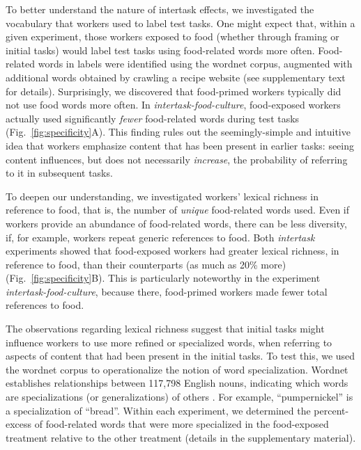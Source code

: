 \documentclass{pnastwo}
\begin{document}
\begin{article}
To better understand the nature of intertask effects, we investigated the
vocabulary that workers used to label test tasks. One might expect that, within
a given experiment, those workers exposed to food (whether through framing or
initial tasks) would label test tasks using food-related words more often.
Food-related words in labels were identified using the wordnet corpus,
augmented with additional words obtained by crawling a recipe website (see
supplementary text for details).  Surprisingly, we discovered that food-primed
workers typically did not use food words more often. In
\textit{intertask-food-culture}, food-exposed workers actually used
significantly \textit{fewer} food-related words during test tasks
(Fig.~\ref{fig:specificity}A).  This finding rules out the seemingly-simple and
intuitive idea that workers emphasize content that has been present in earlier
tasks: seeing content influences, but does not necessarily \textit{increase},
the probability of referring to it in subsequent tasks.

To deepen our understanding, we investigated workers' lexical richness in
reference to food, that is, the number of \textit{unique} food-related words
used.  Even if workers provide an abundance of food-related words, there can be
less diversity, if, for example, workers repeat generic references to food.
Both \textit{intertask} experiments showed that food-exposed workers had
greater lexical richness, in reference to food, than their counterparts (as
much as 20\% more) (Fig.~\ref{fig:specificity}B).  This is particularly
noteworthy in the experiment \textit{intertask-food-culture}, because there,
food-primed workers made fewer total references to food.  

The observations regarding lexical richness suggest that initial tasks might
influence workers to use more refined or specialized words, when referring to
aspects of content that had been present in the initial tasks.  To test this,
we used the wordnet corpus to operationalize the notion of word specialization.
Wordnet establishes relationships between 117,798 English nouns, indicating
which words are specializations (or generalizations) of others
\cite{felbaum1998wordnet}.  For example, ``pumpernickel'' is a specialization
of ``bread''.  Within each experiment, we determined the percent-excess of
food-related words that were more specialized in the food-exposed treatment
relative to the other treatment (details in the supplementary material).


\end{article}
\end{document}

